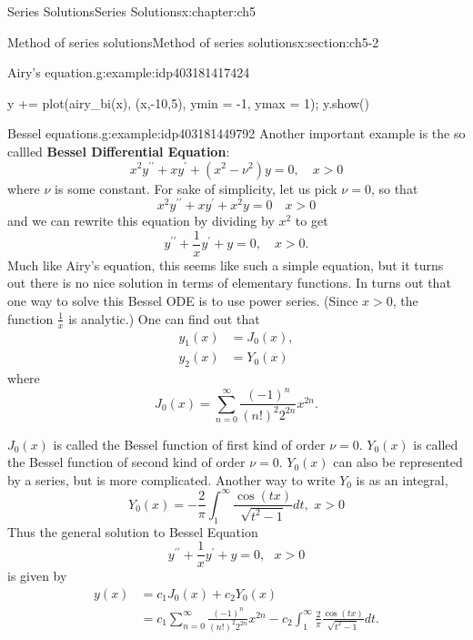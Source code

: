 \documentclass[oneside,10pt,]{book}
\newcommand{\terminology}[1]{\textbf{#1}}
\numberwithin{equation}{section}
\numberwithin{equation}{section}
\newcommand{\amp}{&}
\begin{document}
\begin{chapterptx}{Series Solutions}{}{Series Solutions}{}{}{x:chapter:ch5}
\begin{sectionptx}{Method of series solutions}{}{Method of series solutions}{}{}{x:section:ch5-2}
\begin{example}{Airy's equation.}{g:example:idp403181417424}
\begin{sageinput}
y += plot(airy_bi(x), (x,-10,5), ymin = -1, ymax = 1);
y.show()
\end{sageinput}
\end{example}
\begin{example}{Bessel equations.}{g:example:idp403181449792}%
Another important example is the so callled \terminology{Bessel Differential Equation}:%
\begin{equation*}
x^{2}y^{\prime\prime}+xy^{\prime}+\left(x^{2}-\nu^{2}\right)y=0,\,\,\,\,\,\,x>0
\end{equation*}
where \(\nu\) is some constant. For sake of simplicity, let us pick \(\nu=0\), so that%
\begin{equation*}
x^{2}y^{\prime\prime}+xy^{\prime}+x^{2}y=0\,\,\,\,\,\,x>0
\end{equation*}
and we can rewrite this equation by dividing by \(x^{2}\) to get%
\begin{equation*}
y^{\prime\prime}+\frac{1}{x}y^{\prime}+y=0,\,\,\,\,\,\,x>0.
\end{equation*}
Much like Airy's equation, this seems like such a simple equation, but it turns out there is no nice solution in terms of elementary functions. In turns out that one way to solve this Bessel ODE is to use power series. (Since \(x > 0\), the function \(\frac{1}{x}\) is analytic.) One can find out that%
\begin{align*}
y_{1}(x) \amp =J_{0}(x),\\
y_{2}(x) \amp =Y_{0}(x)
\end{align*}
where%
\begin{equation*}
J_{0}(x) =\sum_{n=0}^{\infty}\frac{(-1)^{n}}{\left(n!\right)^{2}2^{2n}}x^{2n}.
\end{equation*}
%
\par
\(J_{0}(x)\) is called the Bessel function of first kind of order \(\nu=0\). \(Y_{0}(x)\) is called the Bessel function of second kind of order \(\nu=0\). \(Y_{0}(x)\) can also be represented by a series, but is more complicated. Another way to write \(Y_{0}\) is as an integral,%
\begin{equation*}
Y_{0}(x)=-\frac{2}{\pi}\int_{1}^{\infty}\frac{\cos\left(tx\right)}{\sqrt{t^{2}-1}}dt,\,\,x>0
\end{equation*}
Thus the general solution to Bessel Equation%
\begin{equation*}
y^{\prime\prime}+\frac{1}{x}y^{\prime}+y=0,\,\,\,\,x>0
\end{equation*}
is given by%
\begin{align*}
y(x) \amp =c_{1}J_{0}(x)+c_{2}Y_{0}(x)\\
\amp =c_{1}\sum_{n=0}^{\infty}\frac{(-1)^{n}}{\left(n!\right)^{2}2^{2n}}x^{2n}-c_{2}\int_{1}^{\infty}\frac{2}{\pi}\frac{\cos\left(tx\right)}{\sqrt{t^{2}-1}}dt.
\end{align*}
%
\end{example}
\end{sectionptx}
\end{chapterptx}
\end{document}
